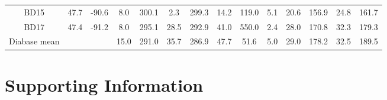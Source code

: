 \begin{sidewaystable}
\begin{tabular}{cccccccccccccc}
BD15             & 47.7 & -90.6 & 8.0  & 300.1   & 2.3          & 299.3   & 14.2    & 119.0 & 5.1                     & 20.6        & 156.9       & 24.8         & 161.7        \\
BD17             & 47.4 & -91.2 & 8.0  & 295.1   & 28.5         & 292.9   & 41.0    & 550.0 & 2.4                     & 28.0        & 170.8       & 32.3         & 179.3        \\
\hline
Diabase mean     &      &       & 15.0 & 291.0   & 35.7         & 286.9   & 47.7    & 51.6  & 5.0                     & 29.0        & 178.2       & 32.5         & 189.5       \\
\hline
\end{tabular}
\label{tab:Pmag_site_data}
\end{sidewaystable}

\section{Supporting Information}
